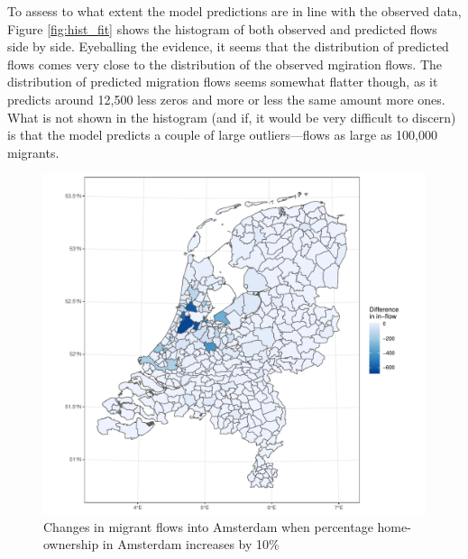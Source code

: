 \documentclass[fleqn,10pt]{SelfArx} %
\begin{document}
{{To assess to what extent the model predictions are in line with the
observed data, Figure \ref{fig:hist_fit} shows the histogram of both
observed and predicted flows side by side. Eyeballing the evidence, it
seems that the distribution of predicted flows comes very close to the
distribution of the observed mgiration flows. The distribution of
predicted migration flows seems somewhat flatter though, as it
predicts around 12,500 less zeros and more or less the same amount
more ones. What is not shown in the histogram (and if, it would be
very difficult to discern) is that the model predicts a couple of
large outliers---flows as large as 100,000 migrants.

\begin{figure}
	\centering \includegraphics[width =
	\columnwidth]{../fig/p_diff_in.pdf}
	\caption{Changes in migrant flows into Amsterdam when percentage home-ownership
		in Amsterdam increases by 10\%}\label{fig:diff_in}
\end{figure}

}}
\end{document}
